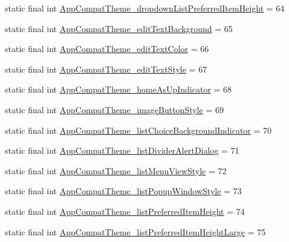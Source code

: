 \begin{DoxyCompactItemize}
\item 
static final int \mbox{\hyperlink{classandroid_1_1support_1_1design_1_1R_1_1styleable_ad119a430cc436566a41fc97a2f07cc61}{App\+Compat\+Theme\+\_\+dropdown\+List\+Preferred\+Item\+Height}} = 64
\item 
static final int \mbox{\hyperlink{classandroid_1_1support_1_1design_1_1R_1_1styleable_ad24ffe9eb7281bd63037797afdce253c}{App\+Compat\+Theme\+\_\+edit\+Text\+Background}} = 65
\item 
static final int \mbox{\hyperlink{classandroid_1_1support_1_1design_1_1R_1_1styleable_ab486979dc06f79e409db764cfa4aa29e}{App\+Compat\+Theme\+\_\+edit\+Text\+Color}} = 66
\item 
static final int \mbox{\hyperlink{classandroid_1_1support_1_1design_1_1R_1_1styleable_aac38861978f6e746a3be9be15cf55efa}{App\+Compat\+Theme\+\_\+edit\+Text\+Style}} = 67
\item 
static final int \mbox{\hyperlink{classandroid_1_1support_1_1design_1_1R_1_1styleable_a95fb0fff5acb797bd9aa3d3064104a16}{App\+Compat\+Theme\+\_\+home\+As\+Up\+Indicator}} = 68
\item 
static final int \mbox{\hyperlink{classandroid_1_1support_1_1design_1_1R_1_1styleable_a4794f3aac674ee35d96ccb6bb74ae9ef}{App\+Compat\+Theme\+\_\+image\+Button\+Style}} = 69
\item 
static final int \mbox{\hyperlink{classandroid_1_1support_1_1design_1_1R_1_1styleable_af558e7fde0f25bbd6024a20fc56f2dc9}{App\+Compat\+Theme\+\_\+list\+Choice\+Background\+Indicator}} = 70
\item 
static final int \mbox{\hyperlink{classandroid_1_1support_1_1design_1_1R_1_1styleable_a9b01db2a8507ac5a0afcc23f6557d38b}{App\+Compat\+Theme\+\_\+list\+Divider\+Alert\+Dialog}} = 71
\item 
static final int \mbox{\hyperlink{classandroid_1_1support_1_1design_1_1R_1_1styleable_a3d0a5aca2aa5430052b66cc0043e56ef}{App\+Compat\+Theme\+\_\+list\+Menu\+View\+Style}} = 72
\item 
static final int \mbox{\hyperlink{classandroid_1_1support_1_1design_1_1R_1_1styleable_ab74bedd716669bdc046b074404569c00}{App\+Compat\+Theme\+\_\+list\+Popup\+Window\+Style}} = 73
\item 
static final int \mbox{\hyperlink{classandroid_1_1support_1_1design_1_1R_1_1styleable_ae51b238e15b18ba621c6154e12d56cee}{App\+Compat\+Theme\+\_\+list\+Preferred\+Item\+Height}} = 74
\item 
static final int \mbox{\hyperlink{classandroid_1_1support_1_1design_1_1R_1_1styleable_a56d0b3454c6ef692c0e5265ec61c86b9}{App\+Compat\+Theme\+\_\+list\+Preferred\+Item\+Height\+Large}} = 75

\end{DoxyCompactItemize}
